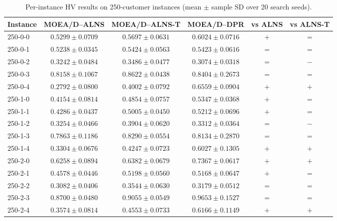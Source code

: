 \begin{table}[t]
\centering
\caption{Per-instance HV results on 250-customer instances (mean $\pm$ sample SD over 20 search seeds).}
\begin{tabular}{lccccc}
\toprule
Instance & MOEA/D--ALNS & MOEA/D--ALNS-T & MOEA/D--DPR & vs ALNS & vs ALNS-T \\
\midrule
250-0-0 & $0.5299 \pm 0.0709$ & $0.5697 \pm 0.0631$ & $\mathbf{0.6024 \pm 0.0716}$ & $+$ & $=$ \\
250-0-1 & $0.5238 \pm 0.0345$ & $\mathbf{0.5424 \pm 0.0563}$ & $0.5423 \pm 0.0616$ & $=$ & $=$ \\
250-0-2 & $0.3242 \pm 0.0484$ & $\mathbf{0.3486 \pm 0.0477}$ & $0.3074 \pm 0.0318$ & $=$ & $-$ \\
250-0-3 & $0.8158 \pm 0.1067$ & $\mathbf{0.8622 \pm 0.0438}$ & $0.8404 \pm 0.2673$ & $=$ & $=$ \\
250-0-4 & $0.2792 \pm 0.0800$ & $0.4002 \pm 0.0792$ & $\mathbf{0.6559 \pm 0.0904}$ & $+$ & $+$ \\
250-1-0 & $0.4154 \pm 0.0814$ & $0.4854 \pm 0.0757$ & $\mathbf{0.5347 \pm 0.0368}$ & $+$ & $=$ \\
250-1-1 & $0.4286 \pm 0.0437$ & $0.5005 \pm 0.0450$ & $\mathbf{0.5212 \pm 0.0696}$ & $+$ & $=$ \\
250-1-2 & $0.3254 \pm 0.0466$ & $\mathbf{0.3904 \pm 0.0620}$ & $0.3312 \pm 0.0364$ & $=$ & $-$ \\
250-1-3 & $0.7863 \pm 0.1186$ & $\mathbf{0.8290 \pm 0.0554}$ & $0.8134 \pm 0.2870$ & $=$ & $=$ \\
250-1-4 & $0.3304 \pm 0.0676$ & $0.4247 \pm 0.0723$ & $\mathbf{0.6027 \pm 0.1305}$ & $+$ & $+$ \\
250-2-0 & $0.6258 \pm 0.0894$ & $0.6382 \pm 0.0679$ & $\mathbf{0.7367 \pm 0.0617}$ & $+$ & $+$ \\
250-2-1 & $0.4578 \pm 0.0446$ & $\mathbf{0.5198 \pm 0.0560}$ & $0.5168 \pm 0.0647$ & $+$ & $=$ \\
250-2-2 & $0.3082 \pm 0.0406$ & $\mathbf{0.3544 \pm 0.0630}$ & $0.3179 \pm 0.0512$ & $=$ & $=$ \\
250-2-3 & $0.8700 \pm 0.0480$ & $0.9055 \pm 0.0549$ & $\mathbf{0.9653 \pm 0.1527}$ & $=$ & $=$ \\
250-2-4 & $0.3574 \pm 0.0814$ & $0.4553 \pm 0.0733$ & $\mathbf{0.6166 \pm 0.1149}$ & $+$ & $+$ \\
\bottomrule
\end{tabular}
\end{table}

